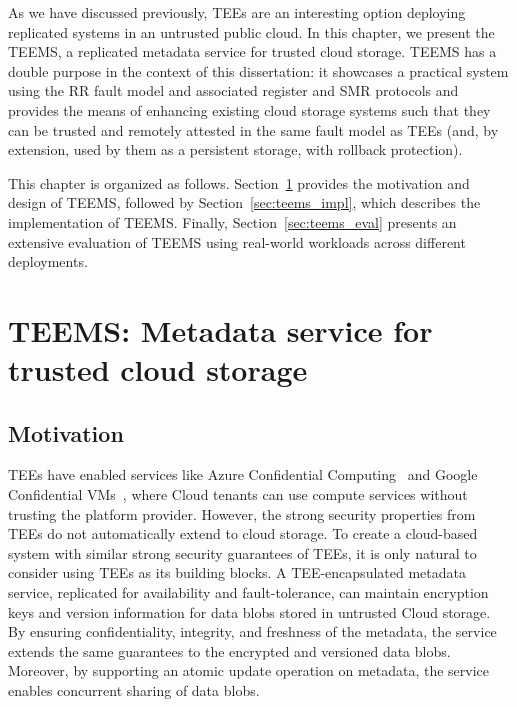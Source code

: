 \label{chap:tee}
\cleardoublepage{}

As we have discussed previously, \acp{TEE} are an interesting
option deploying replicated systems in an untrusted public cloud.
In this chapter, we present the \acf{TEEMS}, a replicated metadata
service for trusted cloud storage. \ac{TEEMS} has a double purpose in
the context of this dissertation: it showcases a practical system
using the \ac{RR} fault model and associated register and
\ac{SMR} protocols and provides the means of enhancing existing
cloud storage systems such that they can be trusted and remotely
attested in the same fault model as \acp{TEE} (and, by extension,
used by them as a persistent storage, with rollback protection).

This chapter is organized as follows.
Section~\ref{sec:teems_design}
provides the motivation and design of \ac{TEEMS}, followed by
Section~\ref{sec:teems_impl}, which describes the implementation
of \ac{TEEMS}. Finally, Section~\ref{sec:teems_eval} presents an
extensive evaluation of \ac{TEEMS} using real-world workloads
across different deployments.

\section{\ac{TEEMS}: Metadata service for trusted cloud
storage}\label{sec:teems_design}


\subsection{Motivation}

\acp{TEE} have enabled services like Azure Confidential
Computing~\cite{azure-conf} and Google Confidential
VMs~\cite{google-confVM}, where Cloud tenants can use compute
services without trusting the platform provider.  However, the
strong security properties from \acp{TEE} do not automatically
extend to cloud storage. To create a cloud-based system with
similar strong security guarantees of \acp{TEE}, it is only
natural to consider using \acp{TEE} as its building blocks. A
\ac{TEE}-encapsulated metadata service, replicated for
availability and fault-tolerance, can maintain encryption keys
and version information for data blobs stored in untrusted Cloud
storage.  By ensuring confidentiality, integrity, and freshness
of the metadata, the service extends the same guarantees to the
encrypted and versioned data blobs. Moreover, by supporting an
atomic update operation on metadata, the service enables
concurrent sharing of data blobs.

